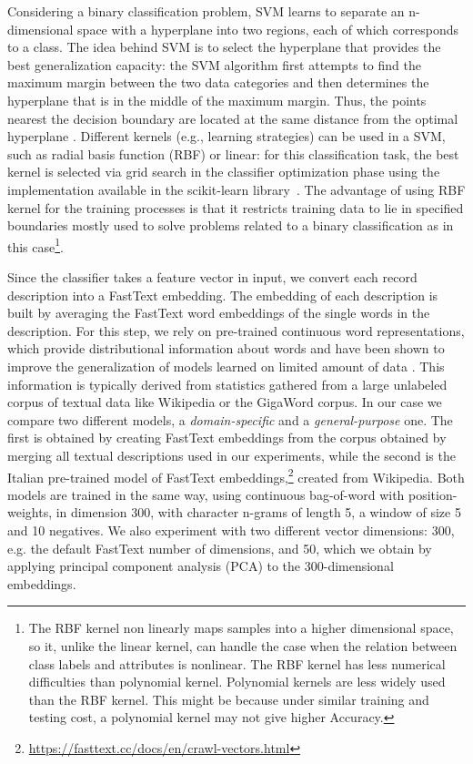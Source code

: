 \documentclass[epsfig,a4paper,12pt,titlepage]{book}
\begin{document}
 Considering a binary classification problem, SVM learns to separate an n-dimensional space with a hyperplane into two regions, each of which corresponds to a class. The idea behind SVM is to select the hyperplane that provides the best generalization capacity: the SVM algorithm first  attempts to find the maximum margin between the two data categories and then determines the hyperplane that is in the middle of the maximum margin. Thus, the points nearest the decision boundary are located at the same distance from the optimal hyperplane \cite{14,15,16}. Different kernels (e.g., learning strategies) can be used in a SVM, such as radial basis function (RBF) or linear: for this classification task, the best kernel is selected via grid search in the classifier optimization phase using the implementation available in the scikit-learn library~\cite{scikit-learn}.
 The advantage of using RBF kernel for the training processes is that it restricts training data to lie in specified boundaries mostly used to solve problems related to a binary classification as in this case\footnote{The RBF kernel non linearly maps samples into a higher dimensional space, so it, unlike the linear kernel, can handle the case when the relation between class labels and attributes is nonlinear. The RBF kernel has less numerical difficulties than polynomial kernel. Polynomial kernels are less widely used than the RBF kernel. This might be because under similar training and testing cost, a polynomial kernel may not give higher Accuracy.}.

Since the classifier takes a feature vector in input, we convert each record description into a FastText embedding. The embedding of each description is built by averaging the FastText word embeddings of the single words in the description. For this step, we rely on pre-trained continuous word representations, which  provide distributional information about words and have been shown to improve the generalization of models learned on limited amount of
data \cite{10.5555/1953048.2078186}. This information is typically
derived from statistics gathered from a large unlabeled corpus of textual data like Wikipedia or the GigaWord corpus. In our case we compare two different models, a \textit{domain-specific} and a \textit{general-purpose} one. The first is obtained by creating FastText embeddings from the corpus obtained by merging all textual descriptions used in our experiments, while the second is the Italian pre-trained model of FastText embeddings,\footnote{\url{https://fasttext.cc/docs/en/crawl-vectors.html}} created from Wikipedia. Both models are trained in the same way, using continuous bag-of-word with position-weights, in dimension 300, with character n-grams of length 5, a window of size 5 and 10 negatives.
We also experiment with two different vector dimensions: 300, e.g. the default FastText number of dimensions, and 50, which we obtain by applying principal component analysis (PCA) \cite{10.2307/2680726} to the 300-dimensional embeddings. 
\end{document}
